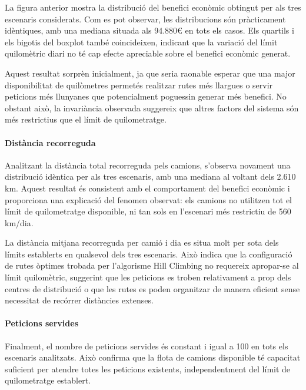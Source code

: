 

La figura anterior mostra la distribució del benefici econòmic obtingut per als tres escenaris considerats. Com es pot observar, les distribucions són pràcticament idèntiques, amb una mediana situada als 94.880€ en tots els casos. Els quartils i els bigotis del boxplot també coincideixen, indicant que la variació del límit quilomètric diari no té cap efecte apreciable sobre el benefici econòmic generat.

Aquest resultat sorprèn inicialment, ja que seria raonable esperar que una major disponibilitat de quilòmetres permetés realitzar rutes més llargues o servir peticions més llunyanes que potencialment poguessin generar més benefici. No obstant això, la invariància observada suggereix que altres factors del sistema són més restrictius que el límit de quilometratge.

\paragraph{Distància recorreguda}



Analitzant la distància total recorreguda pels camions, s'observa novament una distribució idèntica per als tres escenaris, amb una mediana al voltant dels 2.610 km. Aquest resultat és consistent amb el comportament del benefici econòmic i proporciona una explicació del fenomen observat: els camions no utilitzen tot el límit de quilometratge disponible, ni tan sols en l'escenari més restrictiu de 560 km/dia.

La distància mitjana recorreguda per camió i dia es situa molt per sota dels límits establerts en qualsevol dels tres escenaris. Això indica que la configuració de rutes òptimes trobada per l'algorisme Hill Climbing no requereix apropar-se al límit quilomètric, suggerint que les peticions es troben relativament a prop dels centres de distribució o que les rutes es poden organitzar de manera eficient sense necessitat de recórrer distàncies extenses.

\paragraph{Peticions servides}



Finalment, el nombre de peticions servides és constant i igual a 100 en tots els escenaris analitzats. Això confirma que la flota de camions disponible té capacitat suficient per atendre totes les peticions existents, independentment del límit de quilometratge establert.

